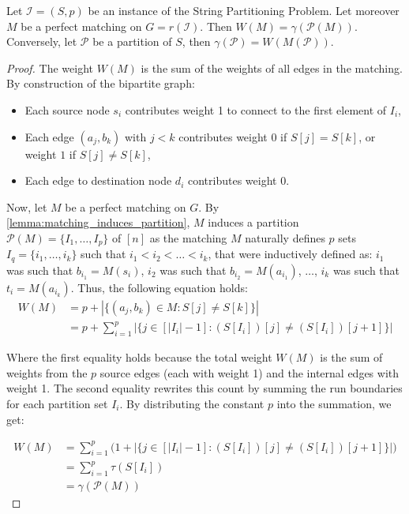 \begin{lemma} \label{lemma:same_cost}
    Let $\mathcal{I}=(S, p)$ be an instance of the String Partitioning Problem. Let moreover $M$ be a perfect matching on $G = r(\mathcal{I})$. Then $W(M) = \gamma(\mathcal{P}(M))$. Conversely, let $\mathcal{P}$ be a partition of $S$, then $\gamma(\mathcal{P})=W(M(\mathcal{P}))$.
\end{lemma}
\begin{proof}    
    The weight $W(M)$ is the sum of the weights of all edges in the matching. By construction of the bipartite graph:
    \begin{itemize}
        \item Each source node $s_i$ contributes weight 1 to connect to the first element of $I_i$,
        \item Each edge $(a_j, b_k)$ with $j < k$ contributes weight $0$ if $S[j] = S[k]$, or weight $1$ if $S[j] \neq S[k]$,
        \item Each edge to destination node $d_i$ contributes weight $0$.
    \end{itemize}
    
    Now, let $M$ be a perfect matching on $G$. By \cref{lemma:matching_induces_partition}, $M$ induces a partition $\mathcal{P}(M) = \{I_1, \ldots, I_p\}$ of $[n]$ as the matching $M$ naturally defines $p$ sets $I_q=\{i_1,\dots,i_k\}$ such that $i_1 <i_2<\dots<i_k$, that were inductively defined as: $i_1$ was such that $b_{i_1} = M(s_i)$, $i_2$ was such that $b_{i_2} = M(a_{i_1})$, $\dots$, $i_k$ was such that $t_i = M(a_{i_k})$. Thus, the following equation holds:
    \begin{align*}
        W(M) &= p + |\{(a_j, b_k) \in M:S[j] \neq S[k]\}| \\
        &= p + \sum_{i=1}^p |\{j \in [|I_i| - 1]:(S[I_i])[j] \neq (S[I_i])[j+1]\}|
    \end{align*}

    Where the first equality holds because the total weight $W(M)$ is the sum of weights from the $p$ source edges (each with weight 1) and the internal edges with weight 1. The second equality rewrites this count by summing the run boundaries for each partition set $I_i$. By distributing the constant $p$ into the summation, we get:

    \begin{align*}
        W(M) &= \sum_{i=1}^p \big( 1 + |\{j \in [|I_i| - 1]:(S[I_i])[j] \neq (S[I_i])[j+1]\}| \big) \\
        &= \sum_{i=1}^p \tau(S[I_i]) \\
        &= \gamma(\mathcal{P}(M))
    \end{align*}
    

\end{proof}
